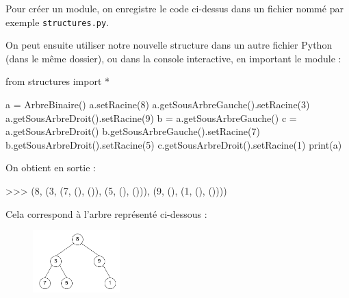 \documentclass[
  a4paper,
  DIV=11,
  numbers=noendperiod]{scrartcl}
\newenvironment{Shaded}{\begin{snugshade}}{\end{snugshade}}
\newcommand{\BuiltInTok}[1]{\textcolor[rgb]{0.00,0.23,0.31}{#1}}
\newcommand{\DecValTok}[1]{\textcolor[rgb]{0.68,0.00,0.00}{#1}}
\newcommand{\ImportTok}[1]{\textcolor[rgb]{0.00,0.46,0.62}{#1}}
\newcommand{\NormalTok}[1]{\textcolor[rgb]{0.00,0.23,0.31}{#1}}
\newcommand{\OperatorTok}[1]{\textcolor[rgb]{0.37,0.37,0.37}{#1}}
\begin{document}
Pour créer un module, on enregistre le code ci-dessus dans un fichier
nommé par exemple \texttt{structures.py}.

On peut ensuite utiliser notre nouvelle structure dans un autre fichier
Python (dans le même dossier), ou dans la console interactive, en
important le module :

\begin{Shaded}
\begin{Highlighting}[]
\ImportTok{from}\NormalTok{ structures }\ImportTok{import} \OperatorTok{*}

\NormalTok{a }\OperatorTok{=}\NormalTok{ ArbreBinaire()}
\NormalTok{a.setRacine(}\DecValTok{8}\NormalTok{)}
\NormalTok{a.getSousArbreGauche().setRacine(}\DecValTok{3}\NormalTok{)}
\NormalTok{a.getSousArbreDroit().setRacine(}\DecValTok{9}\NormalTok{)}
\NormalTok{b }\OperatorTok{=}\NormalTok{ a.getSousArbreGauche()}
\NormalTok{c }\OperatorTok{=}\NormalTok{ a.getSousArbreDroit()}
\NormalTok{b.getSousArbreGauche().setRacine(}\DecValTok{7}\NormalTok{)}
\NormalTok{b.getSousArbreDroit().setRacine(}\DecValTok{5}\NormalTok{)}
\NormalTok{c.getSousArbreDroit().setRacine(}\DecValTok{1}\NormalTok{)}
\BuiltInTok{print}\NormalTok{(a)}
\end{Highlighting}
\end{Shaded}

On obtient en sortie :

\begin{Shaded}
\begin{Highlighting}[]
\OperatorTok{\textgreater{}\textgreater{}\textgreater{}}\NormalTok{ (}\DecValTok{8}\NormalTok{, (}\DecValTok{3}\NormalTok{, (}\DecValTok{7}\NormalTok{, (), ()), (}\DecValTok{5}\NormalTok{, (), ())), (}\DecValTok{9}\NormalTok{, (), (}\DecValTok{1}\NormalTok{, (), ())))}
\end{Highlighting}
\end{Shaded}

Cela correspond à l'arbre représenté ci-dessous :

\begin{figure}

{\centering \includegraphics[width=0.3\textwidth,height=\textheight]{arbre_bin3.png}

}

\end{figure}
\end{document}
